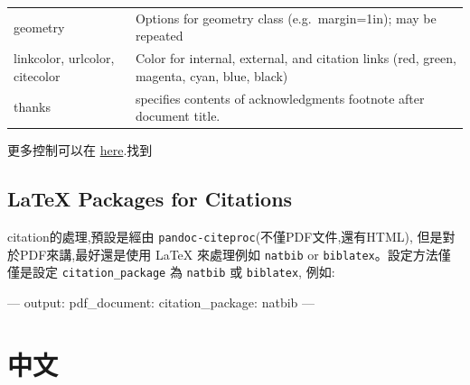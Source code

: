\documentclass[]{book}
\newenvironment{Shaded}{\begin{snugshade}}{\end{snugshade}}
\newcommand{\AttributeTok}[1]{\textcolor[rgb]{0.77,0.63,0.00}{#1}}
\newcommand{\FunctionTok}[1]{\textcolor[rgb]{0.00,0.00,0.00}{#1}}
\newcommand{\OtherTok}[1]{\textcolor[rgb]{0.56,0.35,0.01}{#1}}
\theoremstyle{definition}
\theoremstyle{definition}
\theoremstyle{definition}
\theoremstyle{remark}
\begin{document}
\begin{longtable}[]{@{}ll@{}}
\begin{minipage}[t]{0.47\columnwidth}
geometry\strut
\end{minipage} & \begin{minipage}[t]{0.47\columnwidth}\raggedright
Options for geometry class (e.g.~margin=1in); may be repeated\strut
\end{minipage}\tabularnewline
\begin{minipage}[t]{0.47\columnwidth}\raggedright
linkcolor, urlcolor, citecolor\strut
\end{minipage} & \begin{minipage}[t]{0.47\columnwidth}\raggedright
Color for internal, external, and citation links (red, green, magenta,
cyan, blue, black)\strut
\end{minipage}\tabularnewline
\begin{minipage}[t]{0.47\columnwidth}\raggedright
thanks\strut
\end{minipage} & \begin{minipage}[t]{0.47\columnwidth}\raggedright
specifies contents of acknowledgments footnote after document
title.\strut
\end{minipage}\tabularnewline
\bottomrule
\end{longtable}

更多控制可以在
\href{http://pandoc.org/MANUAL.html\#variables-for-latex}{here}.找到

\hypertarget{latex-packages-for-citations}{%
\subsection{LaTeX Packages for
Citations}\label{latex-packages-for-citations}}

citation的處理,預設是經由
\texttt{pandoc-citeproc}(不僅PDF文件,還有HTML),
但是對於PDF來講,最好還是使用 LaTeX 來處理例如 \texttt{natbib} or
\texttt{biblatex}。設定方法僅僅是設定 \texttt{citation\_package} 為
\texttt{natbib} 或 \texttt{biblatex}, 例如:

\begin{Shaded}
\begin{Highlighting}[]
\OtherTok{---}
\FunctionTok{output:}
  \FunctionTok{pdf_document:}
    \FunctionTok{citation_package:}\AttributeTok{ natbib}
\OtherTok{---}
\end{Highlighting}
\end{Shaded}

\section{中文}
\end{document}

